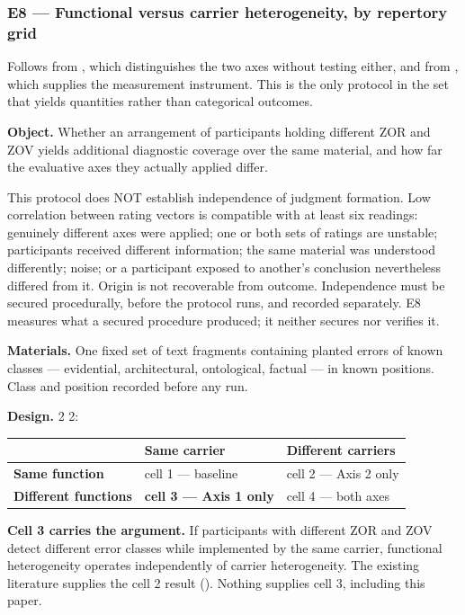 \subsubsection*{E8 — Functional versus carrier heterogeneity, by repertory grid}
\label{sec:en:x-e8-functional-versus-carrier-heterogenei}

Follows from , which distinguishes the two axes without testing either, and from , which supplies the measurement instrument. This is the only protocol in the set that yields quantities rather than categorical outcomes.

\textbf{Object.} Whether an arrangement of participants holding different ZOR and ZOV yields additional diagnostic coverage over the same material, and how far the evaluative axes they actually applied differ.

This protocol does NOT establish independence of judgment formation. Low correlation between rating vectors is compatible with at least six readings: genuinely different axes were applied; one or both sets of ratings are unstable; participants received different information; the same material was understood differently; noise; or a participant exposed to another's conclusion nevertheless differed from it. Origin is not recoverable from outcome. Independence must be secured procedurally, before the protocol runs, and recorded separately. E8 measures what a secured procedure produced; it neither secures nor verifies it.

\textbf{Materials.} One fixed set of text fragments containing planted errors of known classes — evidential, architectural, ontological, factual — in known positions. Class and position recorded before any run.

\textbf{Design.} 2 \gtimes{} 2:

\begin{center}
\small
\begin{tabularx}{\linewidth}{>{\raggedright\arraybackslash}X>{\raggedright\arraybackslash}X>{\raggedright\arraybackslash}X}
\toprule
 & \textbf{Same carrier} & \textbf{Different carriers} \\
\midrule
\textbf{Same function} & cell 1 — baseline & cell 2 — Axis 2 only \\
\textbf{Different functions} & \textbf{cell 3 — Axis 1 only} & cell 4 — both axes \\
\bottomrule
\end{tabularx}
\end{center}
\textbf{Cell 3 carries the argument.} If participants with different ZOR and ZOV detect different error classes while implemented by the same carrier, functional heterogeneity operates independently of carrier heterogeneity. The existing literature supplies the cell 2 result (). Nothing supplies cell 3, including this paper.

